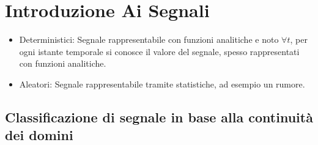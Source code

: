 \section{Introduzione Ai Segnali}
    \begin{itemize}
        \item {
            Deterministici: Segnale rappresentabile con funzioni analitiche e noto $\forall t$, 
            per ogni istante temporale si conosce il valore del segnale, spesso rappresentati con funzioni analitiche.
        }
        \item {
            Aleatori: Segnale rappresentabile tramite statistiche, ad esempio un rumore.
        }
    \end{itemize}
    \subsection{Classificazione di segnale in base alla continuità dei domini}
